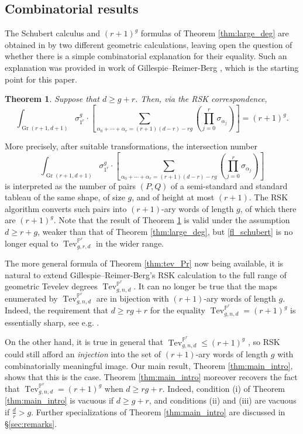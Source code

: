 \documentclass[12pt]{amsart}
\def\bP{\mathbb{P}}
\DeclareMathOperator{\Gr}{Gr}
\DeclareMathOperator{\Tev}{Tev}
\newtheorem{theorem}[definition]{Theorem}
\begin{document}
\subsection{Combinatorial results}

The Schubert calculus and $(r+1)^g$ formulas of Theorem \ref{thm:large_deg} are obtained in \cite{fl} by two different geometric calculations, leaving open the question of whether there is a simple combinatorial explanation for their equality. Such an explanation was provided in work of Gillespie--Reimer-Berg \cite{GenRSK}, which is the starting point for this paper.

\begin{theorem}\cite[Theorem 1.3]{GenRSK}\label{thm:grb}
    Suppose that $d\ge g+r$. Then, via the RSK correspondence,
    \begin{equation*}
\displaystyle\int_{\Gr(r+1,d+1)}\sigma^g_{1^r}\cdot \left[\sum_{\alpha_0+\cdots+\alpha_r=(r+1)(d-r)-rg}\left(\prod_{j=0}^{r}\sigma_{\alpha_j}\right)\right]=(r+1)^g.
\end{equation*}
\end{theorem}
More precisely, after suitable transformations, the intersection number
\begin{equation}\label{fl_schubert}
    \int_{\Gr(r+1,d+1)}\sigma^g_{1^r}\cdot \left[\sum_{\alpha_0+\cdots+\alpha_r=(r+1)(d-r)-rg}\left(\prod_{j=0}^{r}\sigma_{\alpha_j}\right)\right]
\end{equation}
is interpreted as the number of pairs $(P,Q)$ of a semi-standard and standard tableau of the same shape, of size $g$, and of height at most $(r+1)$. The RSK algorithm converts such pairs into $(r+1)$-ary words of length $g$, of which there are $(r+1)^g$. Note that the result of Theorem \ref{thm:grb} is valid under the assumption $d\ge r+g$, weaker than that of Theorem \ref{thm:large_deg}, but \eqref{fl_schubert} is no longer equal to $\Tev^{\bP^r}_{g,r,d}$ in the wider range.

The more general formula of Theorem \ref{thm:tev_Pr} now being available, it is natural to extend Gillespie--Reimer-Berg's RSK calculation to the full range of geometric Tevelev degrees $\Tev^{\bP^r}_{g,n,d}$. It can no longer be true that the maps enumerated by $\Tev^{\bP^r}_{g,n,d}$ are in bijection with $(r+1)$-ary words of length $g$. Indeed, the requirement that $d\ge rg+r$ for the equality $\Tev^{\bP^r}_{g,n,d}=(r+1)^g$ is essentially sharp, see e.g. \cite[Example 1.6]{tev_Pr}. 

On the other hand, it is true in general that $\Tev^{\bP^r}_{g,n,d}\le (r+1)^g$ \cite[Corollary 5.8]{tev_Pr}, so RSK could still afford an \emph{injection} into the set of $(r+1)$-ary words of length $g$ with combinatorially meaningful image. Our main result, Theorem \ref{thm:main_intro}, shows that this is the case. Theorem \ref{thm:main_intro} moreover recovers the fact that $\Tev^{\bP^r}_{g,n,d}=(r+1)^g$ when $d\ge rg+r$. Indeed, condition (i) of Theorem \ref{thm:main_intro} is vacuous if $d\ge g+r$, and conditions (ii) and (iii) are vacuous if $\frac{d}{r}>g$. Further specializations of Theorem \ref{thm:main_intro} are discussed in \S\ref{sec:remarks}.
\end{document}
